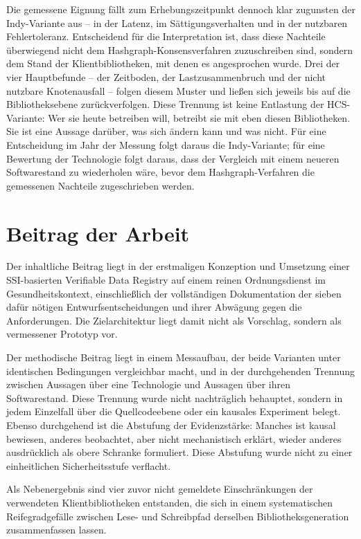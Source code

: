 Die gemessene Eignung fällt zum Erhebungszeitpunkt dennoch klar zugunsten der Indy-Variante aus -- in der Latenz, im Sättigungsverhalten und in der nutzbaren Fehlertoleranz. Entscheidend für die Interpretation ist, dass diese Nachteile überwiegend nicht dem Hashgraph-Konsensverfahren zuzuschreiben sind, sondern dem Stand der Klientbibliotheken, mit denen es angesprochen wurde. Drei der vier Hauptbefunde -- der Zeitboden, der Lastzusammenbruch und der nicht nutzbare Knotenausfall -- folgen diesem Muster und ließen sich jeweils bis auf die Bibliotheksebene zurückverfolgen. Diese Trennung ist keine Entlastung der HCS-Variante: Wer sie heute betreiben will, betreibt sie mit eben diesen Bibliotheken. Sie ist eine Aussage darüber, was sich ändern kann und was nicht. Für eine Entscheidung im Jahr der Messung folgt daraus die Indy-Variante; für eine Bewertung der Technologie folgt daraus, dass der Vergleich mit einem neueren Softwarestand zu wiederholen wäre, bevor dem Hashgraph-Verfahren die gemessenen Nachteile zugeschrieben werden.

\section{Beitrag der Arbeit}
\label{sec:conclusion-beitrag}

Der inhaltliche Beitrag liegt in der erstmaligen Konzeption und Umsetzung einer SSI-basierten Verifiable Data Registry auf einem reinen Ordnungsdienst im Gesundheitskontext, einschließlich der vollständigen Dokumentation der sieben dafür nötigen Entwurfsentscheidungen und ihrer Abwägung gegen die Anforderungen. Die Zielarchitektur liegt damit nicht als Vorschlag, sondern als vermessener Prototyp vor.

Der methodische Beitrag liegt in einem Messaufbau, der beide Varianten unter identischen Bedingungen vergleichbar macht, und in der durchgehenden Trennung zwischen Aussagen über eine Technologie und Aussagen über ihren Softwarestand. Diese Trennung wurde nicht nachträglich behauptet, sondern in jedem Einzelfall über die Quellcodeebene oder ein kausales Experiment belegt. Ebenso durchgehend ist die Abstufung der Evidenzstärke: Manches ist kausal bewiesen, anderes beobachtet, aber nicht mechanistisch erklärt, wieder anderes ausdrücklich als obere Schranke formuliert. Diese Abstufung wurde nicht zu einer einheitlichen Sicherheitsstufe verflacht.

Als Nebenergebnis sind vier zuvor nicht gemeldete Einschränkungen der verwendeten Klientbibliotheken entstanden, die sich in einem systematischen Reifegradgefälle zwischen Lese- und Schreibpfad derselben Bibliotheksgeneration zusammenfassen lassen.

